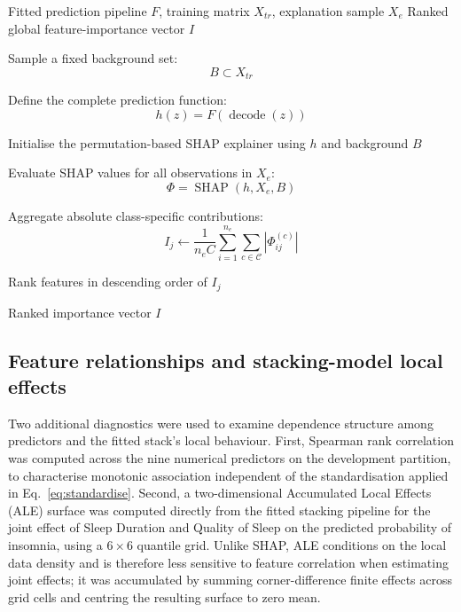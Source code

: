 \documentclass[a4paper,fleqn]{cas-dc}
\begin{document}
\begin{algorithm}[tbp]
\caption{Permutation-SHAP Procedure for Global Model Auditing}
\label{alg:shap}
\small
\setlength{\abovedisplayskip}{3pt}
\setlength{\belowdisplayskip}{3pt}
\begin{algorithmic}[1]

\Require Fitted prediction pipeline $F$, training matrix $X_{tr}$,
explanation sample $X_e$
\Ensure Ranked global feature-importance vector $I$

\State Sample a fixed background set:
\[
B\subset X_{tr}
\]

\State Define the complete prediction function:
\[
h(z)=F(\operatorname{decode}(z))
\]

\State Initialise the permutation-based SHAP explainer
using $h$ and background $B$

\State Evaluate SHAP values for all observations in $X_e$:
\[
\Phi=\operatorname{SHAP}(h,X_e,B)
\]


    \State Aggregate absolute class-specific contributions:
    \[
    I_j\gets
    \frac{1}{n_eC}
    \sum_{i=1}^{n_e}
    \sum_{c\in\mathcal{C}}
    \left|\Phi_{ij}^{(c)}\right|
    \]

\EndFor

\State Rank features in descending order of $I_j$

\State \Return Ranked importance vector $I$

\end{algorithmic}
\end{algorithm}

\subsection{Feature relationships and stacking-model local effects}
\label{sec:ale}
Two additional diagnostics were used to examine dependence structure among predictors and the fitted stack's local behaviour. First, Spearman rank correlation was computed across the nine numerical predictors on the development partition, to characterise monotonic association independent of the standardisation applied in Eq.~\eqref{eq:standardise}. Second, a two-dimensional Accumulated Local Effects (ALE) surface was computed directly from the fitted stacking pipeline for the joint effect of Sleep Duration and Quality of Sleep on the predicted probability of insomnia, using a $6\times6$ quantile grid. Unlike SHAP, ALE conditions on the local data density and is therefore less sensitive to feature correlation when estimating joint effects; it was accumulated by summing corner-difference finite effects across grid cells and centring the resulting surface to zero mean.
\end{document}
